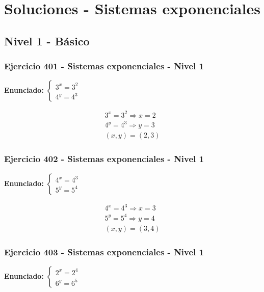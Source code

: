 \documentclass[12pt,a4paper]{article}
\begin{document}
\newpage
\section*{Soluciones - Sistemas exponenciales}

\subsection*{Nivel 1 - Básico}

\subsubsection*{Ejercicio 401 - Sistemas exponenciales - Nivel 1}
\textbf{Enunciado:} \(\begin{cases} 3^x=3^{2}\\ 4^y=4^{3}\end{cases}\)

\[
\begin{aligned}
3^x=3^{2}\Rightarrow x=2\\
4^y=4^{3}\Rightarrow y=3\\
\boxed{(x,y)=(2,3)}
\end{aligned}
\]


\subsubsection*{Ejercicio 402 - Sistemas exponenciales - Nivel 1}
\textbf{Enunciado:} \(\begin{cases} 4^x=4^{3}\\ 5^y=5^{4}\end{cases}\)

\[
\begin{aligned}
4^x=4^{3}\Rightarrow x=3\\
5^y=5^{4}\Rightarrow y=4\\
\boxed{(x,y)=(3,4)}
\end{aligned}
\]


\subsubsection*{Ejercicio 403 - Sistemas exponenciales - Nivel 1}
\textbf{Enunciado:} \(\begin{cases} 2^x=2^{4}\\ 6^y=6^{5}\end{cases}\)
\end{document}
